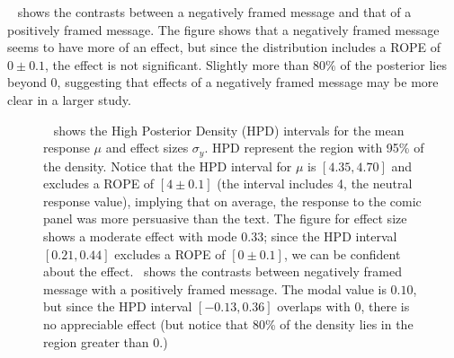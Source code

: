 ~ shows the contrasts between a negatively framed message and that of a positively framed message. The figure shows that a negatively framed message seems to have more of an effect, but since the distribution includes a ROPE of $0 \pm 0.1$, the effect is not significant. Slightly more than $80\%$ of the posterior lies beyond 0, suggesting that effects of a negatively framed message may be more clear in a larger study.



\begin{figure}
  \hfill
 \caption{~ shows the High Posterior Density (HPD) intervals for the mean response $\mu$ and effect sizes $\sigma_y$. HPD represent the region with 95\% of the density. Notice that the HPD interval for $\mu$ is $[4.35, 4.70]$ and excludes a ROPE of $[4\pm 0.1]$ (the interval includes 4, the neutral response value), implying that on average, the response to the comic panel was more persuasive than the text. The figure for effect size shows a moderate effect with mode $0.33$; since the HPD interval $[0.21, 0.44]$ excludes a ROPE of $[0\pm 0.1]$, we can be confident about the effect.~ shows the contrasts between negatively framed message with a positively framed message. The modal value is $0.10$, but since the HPD interval $[-0.13, 0.36]$ overlaps with 0, there is no appreciable effect (but notice that 80\% of the density lies in the region greater than 0.)}
 \label{fig:main-experiment-effect}
\end{figure}

